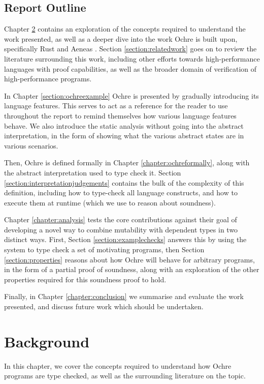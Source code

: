 \documentclass[12pt,twoside]{report}
\begin{document}
\section{Report Outline}
Chapter \ref{chapter:background} contains an exploration of the concepts required to understand the work presented, as well as a deeper dive into the work Ochre is built upon, specifically Rust and Aeneas \citep{aeneas}. Section \ref{section:relatedwork} goes on to review the literature surrounding this work, including other efforts towards high-performance languages with proof capabilities, as well as the broader domain of verification of high-performance programs. 

In Chapter \ref{section:ochreexample} Ochre is presented by gradually introducing its language features. This serves to act as a reference for the reader to use throughout the report to remind themselves how various language features behave. We also introduce the static analysis without going into the abstract interpretation, in the form of showing what the various abstract states are in various scenarios.

Then, Ochre is defined formally in Chapter \ref{chapter:ochreformally}, along with the abstract interpretation used to type check it. Section \ref{section:interpretationjudgements} contains the bulk of the complexity of this definition, including how to type-check all language constructs, and how to execute them at runtime (which we use to reason about soundness).

Chapter \ref{chapter:analysis} tests the core contributions against their goal of developing a novel way to combine mutability with dependent types in two distinct ways. First, Section \ref{section:examplechecks} answers this by using the system to type check a set of motivating programs, then Section \ref{section:properties} reasons about how Ochre will behave for arbitrary programs, in the form of a partial proof of soundness, along with an exploration of the other properties required for this soundness proof to hold.

Finally, in Chapter \ref{chapter:conclusion} we summarise and evaluate the work presented, and discuss future work which should be undertaken.

\chapter{Background}
\label{chapter:background}
In this chapter, we cover the concepts required to understand how Ochre programs are type checked, as well as the surrounding literature on the topic. 
\end{document}
